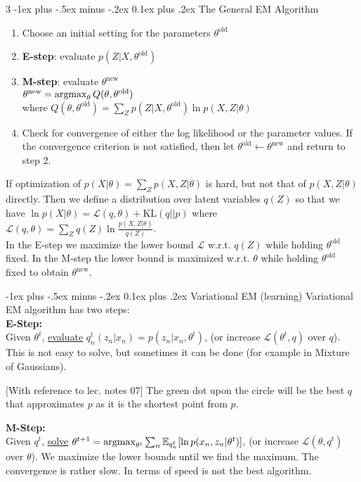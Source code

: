 \documentclass[a4paper,landscape]{amsmlaj}
\makeatletter
\renewcommand{\subsection}{\@startsection{subsection}{2}{0mm}
	{-1ex plus -.5ex minus -.2ex}
	{0.1ex plus .2ex}
	{\normalfont\normalsize\bfseries}}
\makeatother
\begin{document}
\begin{multicols*}{3}
\subsection{The General EM Algorithm}
\begin{enumerate} \setlength\itemsep{-1mm}
	\item Choose an initial setting for the parameters $\theta^\text{old}$
	\item \textbf{E-step}: evaluate $p(Z|X,\theta^\text{old})$
	\item \textbf{M-step}: evaluate $\theta^\text{new}$ \\
		$\theta^\text{new} = \argmax_\theta{Q(\theta,\theta^\text{old})}$ \\
		where $Q(\theta,\theta^\text{old}) = \sum_Z p(Z|X,\theta^\text{old})\ln p(X,Z|\theta)$
	\item Check for convergence of either the log likelihood or the parameter
		values. If the convergence criterion is not satisfied, then let
		$\theta^\text{old} \leftarrow \theta^\text{new}$ and return to step 2.
\end{enumerate}
If optimization of $p(X|\theta) = \sum_Z p(X,Z|\theta)$ is hard, but not that of
$p(X,Z|\theta)$ directly. Then we define a distribution over latent variables
$q(Z)$ so that we have $\ln p(X|\theta) = \mathcal{L}(q,\theta) + \text{KL}(q||p)$
where $\mathcal{L}(q,\theta) = \sum_Z q(Z) \ln\frac{p(X,Z|\theta)}{q(Z)}$. \\
In the E-step we maximize the lower bound $\mathcal{L}$ w.r.t. $q(Z)$ while
holding $\theta^\text{old}$ fixed. In the M-step the lower bound is maximized w.r.t.
$\theta$ while holding $\theta^\text{old}$ fixed to obtain $\theta^\text{new}$.

\subsection{Variational EM (learning)}
Variational EM algorithm has two steps:\\
\textbf{E-Step:} \\
Given $\theta^t$, \underline{evaluate} $q_n^t(z_n|x_n) = p(z_n|x_n,\theta^t)$,
(or increase $\mathcal{L}(\theta^t, q)$ over $q$). This is not easy to solve,
but sometimes it can be done (for example in Mixture of Gaussians).

[With reference to lec. notes 07] The green dot upon the circle will be the
best $q$ that approximates $p$ as it is the shortest point from $p$.

\textbf{M-Step:} \\
Given $q^t$, \underline{solve}
$\theta^{t+1} = \argmax_{\theta^t} \sum_{n} \Ex_{q_n^t}[\ln p(x_n,z_n|\theta^t)]$,
(or increase $\mathcal{L}(\theta,q^t)$ over $\theta$). We maximize the lower
bounds until we find the maximum. The convergence is rather slow. In terms of
speed is not the best algorithm.


\end{multicols*}
\end{document}
